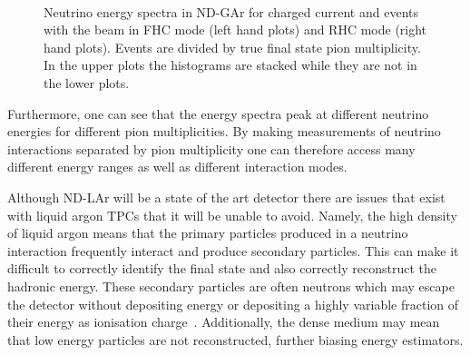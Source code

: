 \begin{figure}[h]
	\begin{minipage}[t]{.5\linewidth}
		\begin{adjustbox}{max totalsize=\linewidth, center}
				
		\end{adjustbox}
	\end{minipage}
	\hfill
	\begin{minipage}[t]{.5\linewidth}
		\begin{adjustbox}{max totalsize=\linewidth, center}
				
		\end{adjustbox}
	\end{minipage} \\
	\begin{minipage}[t]{.5\linewidth}
		\begin{adjustbox}{max totalsize=\linewidth, center}
				
		\end{adjustbox}
	\end{minipage}
	\hfill
	\begin{minipage}[t]{.5\linewidth}
		\begin{adjustbox}{max totalsize=\linewidth, center}
				
		\end{adjustbox}
	\end{minipage}
	\caption[Neutrino energy spectrum in ND-GAr divided by pion multiplicity.]{Neutrino energy spectra in ND-GAr for charged current \numu and \anumu events with the beam in FHC mode (left hand plots) and RHC mode (right hand plots). Events are divided by true final state pion multiplicity. In the upper plots the histograms are stacked while they are not in the lower plots.}
	\label{fig:energyByMode}
\end{figure}

Furthermore, one can see that the energy spectra peak at different neutrino energies for different pion multiplicities. 
By making measurements of neutrino interactions separated by pion multiplicity one can therefore access many different energy ranges as well as different interaction modes.

Although ND-LAr will be a state of the art detector there are issues that exist with liquid argon TPCs that it will be unable to avoid.
Namely, the high density of liquid argon means that the primary particles produced in a neutrino interaction frequently interact and produce secondary particles.
This can make it difficult to correctly identify the final state and also correctly reconstruct the hadronic energy.
These secondary particles are often neutrons which may escape the detector without depositing energy or depositing a highly variable fraction of their energy as ionisation charge~\cite{Friedland_2019}.
Additionally, the dense medium may mean that low energy particles are not reconstructed, further biasing energy estimators.

